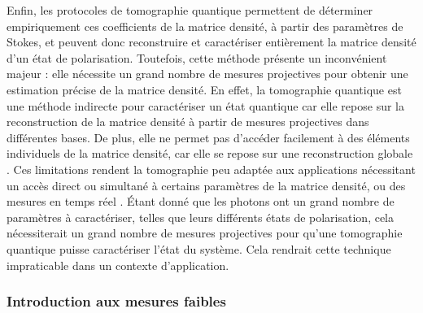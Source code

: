 \begin{onehalfspace}
    \noindent Enfin, les protocoles de tomographie quantique 
    permettent de déterminer empiriquement ces coefficients de la matrice 
    densité, à partir des paramètres de Stokes, et peuvent donc 
    reconstruire et caractériser entièrement la matrice densité 
    d’un état de polarisation. Toutefois, cette méthode présente un inconvénient 
    majeur : elle nécessite un grand nombre de mesures projectives pour
    obtenir une estimation précise de la matrice densité. En effet,
    la tomographie quantique est une méthode indirecte pour 
    caractériser un état quantique \cite{Lundeen_Direct_Measurement}
    car elle repose sur la reconstruction de la matrice densité à partir
    de mesures projectives dans différentes bases.
    De plus, elle ne permet pas d'accéder facilement à des
    éléments individuels de la matrice densité, car elle se repose sur une reconstruction globale
    \cite{Guilleaum}. Ces limitations rendent la tomographie peu adaptée
    aux applications nécessitant un accès direct ou simultané à certains 
    paramètres de la matrice densité, ou des mesures en temps réel
    \cite{TomoReview}.
    Étant donné que les photons ont un grand nombre de 
    paramètres à caractériser, telles que leurs différents états 
    de polarisation, cela nécessiterait un grand nombre de 
    mesures projectives pour qu'une tomographie quantique 
    puisse caractériser l'état du système. Cela rendrait cette 
    technique impraticable dans un contexte d'application.
\end{onehalfspace}

\subsubsection{Introduction aux mesures faibles}


